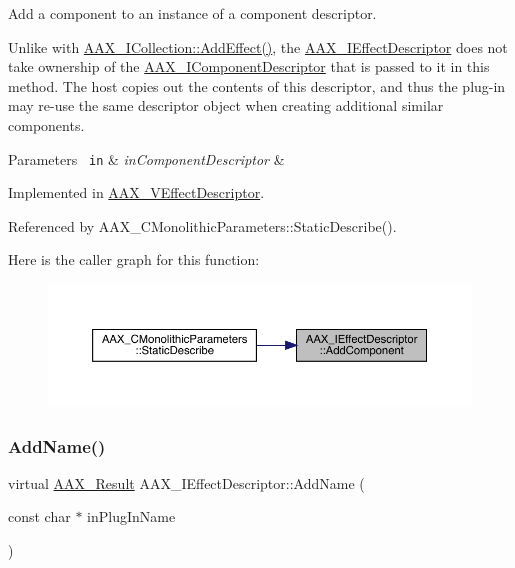 Add a component to an instance of a component descriptor. 

Unlike with \mbox{\hyperlink{a01777_a5ff114b8c4da2081515186f2faf65c8c}{A\+A\+X\+\_\+\+I\+Collection\+::\+Add\+Effect()}}, the \mbox{\hyperlink{a01813}{A\+A\+X\+\_\+\+I\+Effect\+Descriptor}} does not take ownership of the \mbox{\hyperlink{a01781}{A\+A\+X\+\_\+\+I\+Component\+Descriptor}} that is passed to it in this method. The host copies out the contents of this descriptor, and thus the plug-\/in may re-\/use the same descriptor object when creating additional similar components.


\begin{DoxyParams}[1]{Parameters}
\mbox{\texttt{ in}}  & {\em in\+Component\+Descriptor} & \\
\hline
\end{DoxyParams}


Implemented in \mbox{\hyperlink{a01913_ab64b449fc1176f1d4e782b3fa307ad1f}{A\+A\+X\+\_\+\+V\+Effect\+Descriptor}}.



Referenced by A\+A\+X\+\_\+\+C\+Monolithic\+Parameters\+::\+Static\+Describe().

Here is the caller graph for this function\+:
\nopagebreak
\begin{figure}[H]
\begin{center}
\leavevmode
\includegraphics[width=350pt]{a01813_aec33938f50461dd5e7c1dcc25faf6917_icgraph}
\end{center}
\end{figure}
\mbox{\label{a01813_a0d3a0e258050524ba6fbc354f16df207}} 
\subsubsection{\texorpdfstring{AddName()}{AddName()}}
{\footnotesize\ttfamily virtual \mbox{\hyperlink{a00392_a4d8f69a697df7f70c3a8e9b8ee130d2f}{A\+A\+X\+\_\+\+Result}} A\+A\+X\+\_\+\+I\+Effect\+Descriptor\+::\+Add\+Name (\begin{DoxyParamCaption}\item[{const char $\ast$}]{in\+Plug\+In\+Name }\end{DoxyParamCaption})\hspace{0.3cm}{\ttfamily [pure virtual]}}



